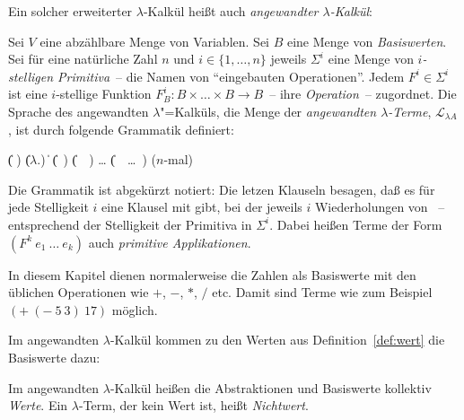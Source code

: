 Ein solcher erweiterter $\lambda$-Kalkül heißt auch
\textit{angewandter $\lambda$-Kalkül}:

\begin{definition}\label{def:lambda-angewandt}
  
  Sei $V$ eine abzählbare Menge von Variablen.  Sei $B$ eine Menge von
  \textit{Basiswerten}.  Sei für eine natürliche
  Zahl $n$ und $i \in \{1, \ldots, n\}$ jeweils $\Sigma^i$ eine Menge
  von \textit{$i$-stelligen Primitiva}~-- die Namen
  von "`eingebauten Operationen"'.  Jedem $F^i\in\Sigma^i$ ist eine
  $i$-stellige Funktion $F_B^i: B\times\ldots\times B \rightarrow
  B$~-- ihre \textit{Operation}~--
  zugordnet.  Die Sprache des angewandten $\lambda$"=Kalküls, die
  Menge der \textit{angewandten $\lambda$-Terme},
  $\mathcal{L}_{\lambda{}A}$, ist
  durch folgende Grammatik definiert:
  \begin{grammar}
     \: 
    \> \| ( )
    \> \| ($\lambda$.)
    \> \| 
    \> \| (~)
    \> \| (~~)
    \> \ldots
    \> \| (~~\ldots~) \quad \textrm{($n$-mal)}
  \end{grammar}
  Die Grammatik ist abgekürzt notiert: Die letzen Klauseln besagen,
  daß es für jede Stelligkeit $i$ eine Klausel mit  gibt,
  bei der jeweils $i$ Wiederholungen von
  ~-- entsprechend der Stelligkeit
  der Primitiva in $\Sigma^i$.
Dabei heißen Terme der Form $(F^k~e_1~\ldots~e_k)$ auch
\textit{primitive Applikationen}.
\end{definition}
%
In diesem Kapitel dienen normalerweise die Zahlen als Basiswerte mit
den üblichen Operationen wie $+$, $-$, $\ast$, $/$ etc.  Damit sind
Terme wie zum Beispiel $(+~(-~5~3)~17)$ möglich.

Im angewandten $\lambda$-Kalkül kommen zu den Werten aus
Definition~\ref{def:wert} die Basiswerte dazu:
%
\begin{definition}\label{def:wert-angewandt}
  Im angewandten $\lambda$-Kalkül heißen die Abstraktionen und
  Basiswerte kollektiv \textit{Werte}.  Ein $\lambda$-Term, der kein
  Wert ist, heißt \textit{Nichtwert}.
\end{definition}

